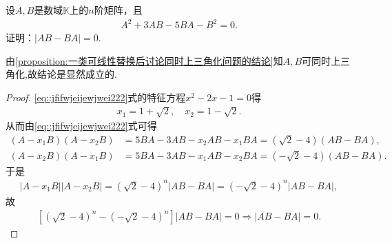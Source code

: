 \documentclass[../../main.tex]{subfiles}%
\begin{document}
\begin{example}
设\(A,B\)是数域\(\mathbb{K}\)上的\(n\)阶矩阵，且
\begin{align}\label{eq::jfifwjeijewjwei222}
A^2+3AB-5BA-B^2=0. 
\end{align}
证明：\(\left| AB-BA \right|=0.\)
\end{example}
\begin{remark}
由\cref{proposition:一类可线性替换后讨论同时上三角化问题的结论}知$A,B$可同时上三角化,故结论是显然成立的.
\end{remark}
\begin{proof}
\eqref{eq::jfifwjeijewjwei222}式的特征方程\(x^2-2x-1=0\)得
\begin{align*}
x_1=1+\sqrt{2},\quad x_2=1-\sqrt{2}.
\end{align*}
从而由\eqref{eq::jfifwjeijewjwei222}式可得
\begin{align*}
\left( A-x_1B \right) \left( A-x_2B \right) &=5BA-3AB-x_2AB-x_1BA=\left( \sqrt{2}-4 \right) \left( AB-BA \right), \\
\left( A-x_2B \right) \left( A-x_1B \right) &=5BA-3AB-x_1AB-x_2BA=\left( -\sqrt{2}-4 \right) \left( AB-BA \right).
\end{align*}
于是
\begin{align*}
\left| A-x_1B \right|\left| A-x_2B \right|=\left( \sqrt{2}-4 \right) ^n\left| AB-BA \right|=\left( -\sqrt{2}-4 \right) ^n\left| AB-BA \right|,
\end{align*}
故
\begin{align*}
\left[ \left( \sqrt{2}-4 \right) ^n-\left( -\sqrt{2}-4 \right) ^n \right] \left| AB-BA \right|=0\Longrightarrow \left| AB-BA \right|=0.
\end{align*}
\end{proof}
\end{document}

